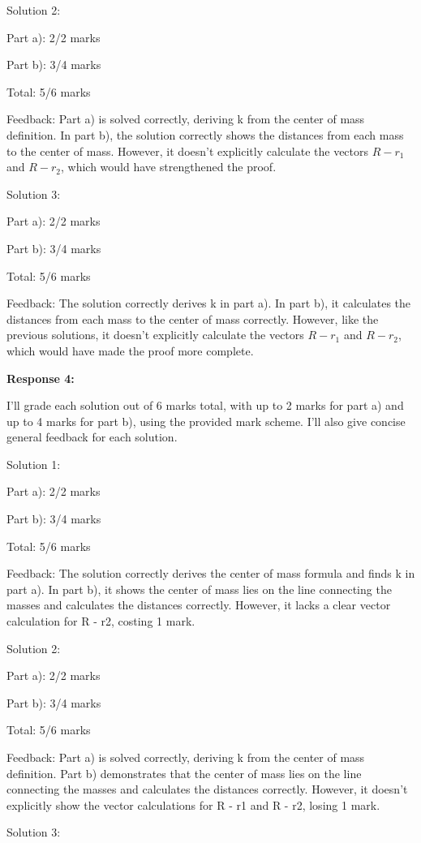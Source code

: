 \documentclass[a4paper,11pt]{article}
\begin{document}
Solution 2:

Part a): 2/2 marks

Part b): 3/4 marks

Total: 5/6 marks

Feedback: Part a) is solved correctly, deriving k from the center of mass definition. In part b), the solution correctly shows the distances from each mass to the center of mass. However, it doesn't explicitly calculate the vectors \(R - r_1\) and \(R - r_2\), which would have strengthened the proof.

Solution 3:

Part a): 2/2 marks

Part b): 3/4 marks

Total: 5/6 marks

Feedback: The solution correctly derives k in part a). In part b), it calculates the distances from each mass to the center of mass correctly. However, like the previous solutions, it doesn't explicitly calculate the vectors \(R - r_1\) and \(R - r_2\), which would have made the proof more complete.

\bigskip
\textbf{Response 4:}

I'll grade each solution out of 6 marks total, with up to 2 marks for part a) and up to 4 marks for part b), using the provided mark scheme. I'll also give concise general feedback for each solution.

Solution 1:

Part a): 2/2 marks

Part b): 3/4 marks

Total: 5/6 marks

Feedback: The solution correctly derives the center of mass formula and finds k in part a). In part b), it shows the center of mass lies on the line connecting the masses and calculates the distances correctly. However, it lacks a clear vector calculation for R - r2, costing 1 mark.

Solution 2:

Part a): 2/2 marks

Part b): 3/4 marks

Total: 5/6 marks

Feedback: Part a) is solved correctly, deriving k from the center of mass definition. Part b) demonstrates that the center of mass lies on the line connecting the masses and calculates the distances correctly. However, it doesn't explicitly show the vector calculations for R - r1 and R - r2, losing 1 mark.

Solution 3:
\end{document}
